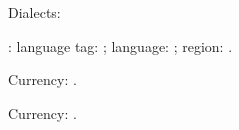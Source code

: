 \documentclass{article}
\begin{document}
Dialects:
\ForEachTrackedDialect\thisdialect
{
\par
\thisdialect:
language tag: \GetTrackedLanguageTag{\thisdialect};
language: \TrackedLanguageFromDialect{\thisdialect};
region: \TrackedIsoCodeFromLanguage{\TwoLetterIsoCountryCode}{\thisdialect}.
 }

Currency: \result.

Currency: \result.
\end{document}
